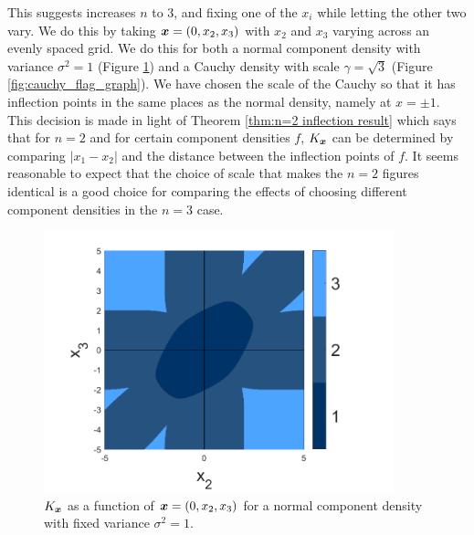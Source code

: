 	This suggests increases $n$ to $3$, and fixing one of the $x_i$ while letting the other two vary. We do this by taking ${\bm{{x}}} = (0, x_2, x_3)$ with $x_2$ and $x_3$ varying across an evenly spaced grid. We do this for both a normal component density with variance $\sigma^2 = 1$ (Figure \ref{fig:normal_flag_graph}) and a Cauchy density with scale $\gamma = \sqrt{3}$ (Figure \ref{fig:cauchy_flag_graph}). We have chosen the scale of the Cauchy so that it has inflection points in the same places as the normal density, namely at $x = \pm 1$. This decision is made in light of Theorem \ref{thm:n=2 inflection result} which says that for $n = 2$ and for certain component densities $f$, $K_{\bm{{x}}}$ can be determined by comparing $|x_1 - x_2|$ and the distance between the inflection points of $f$. It seems reasonable to expect that the choice of scale that makes the $n = 2$ figures identical is a good choice for comparing the effects of choosing different component densities in the $n = 3$ case.

	
	\begin{figure}
		\centering
		\includegraphics[width=0.9\textwidth]{normal_flag_graph.png}
		\caption{$K_{\bm{{x}}}$ as a function of ${\bm{{x}}} = (0, x_2, x_3)$ for a normal component density with fixed variance $\sigma^2 = 1$.}\label{fig:normal_flag_graph}
	\end{figure}

